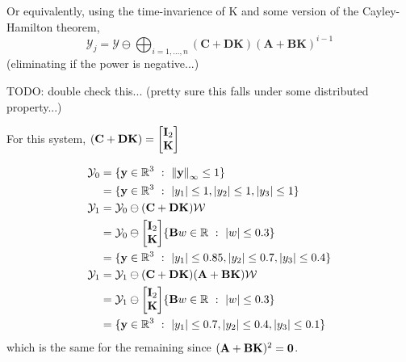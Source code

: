 \documentclass[]{article}
\newcommand{\R}{\mathbb{R}}
\newcommand{\st}{\ : \ }
\begin{document}
Or equivalently, using the time-invarience of K and some version of the Cayley-Hamilton theorem, 
\begin{equation}
    \mathcal{Y}_{j} = \mathcal{Y} \ominus \bigoplus_{i = 1,\dots,n} (\mathbf{C+DK}) (\mathbf{A+BK})^{i-1}
\end{equation}
(eliminating if the power is negative...)

TODO: double check this... (pretty sure this falls under some distributed property...)

For this system,
$(\mathbf{C+DK}) = \mqty[\vb{I}_2\\\mathbf{K}]$

\begin{equation}
    \begin{aligned}
        \mathcal{Y}_0 &= \{\vb{y} \in \R^3 \st \norm{\vb{y}}_{\infty}\leq 1\}\\
            &= \{\vb{y} \in \R^{3} \st \abs{y_1} \leq 1, \abs{y_2} \leq 1, \abs{y_3}\leq 1\}\\
        \mathcal{Y}_1 &= \mathcal{Y}_0 \ominus (\mathbf{C+DK}) \mathcal{W}\\
            &= \mathcal{Y}_0 \ominus \mqty[\vb{I}_2\\\mathbf{K}] \{ \vb{B} w \in \R \st \abs{w} \leq 0.3\}\\
            &= \{\vb{y} \in \R^{3} \st \abs{y_1} \leq 0.85, \abs{y_2} \leq 0.7, \abs{y_3}\leq 0.4\}\\
        \mathcal{Y}_1 &= \mathcal{Y}_1 \ominus (\mathbf{C+DK}) \mathbf{(A+BK)}\mathcal{W}\\
            &= \mathcal{Y}_1 \ominus \mqty[\vb{I}_2\\\mathbf{K}] \{\vb{B} w \in \R \st \abs{w} \leq 0.3\}\\
            &= \{\vb{y} \in \R^{3} \st \abs{y_1} \leq 0.7, \abs{y_2} \leq 0.4, \abs{y_3}\leq 0.1\}\\
    \end{aligned}
\end{equation}
which is the same for the remaining since $(\mathbf{A+BK})^2 = \vb{0}$.
\end{document}

